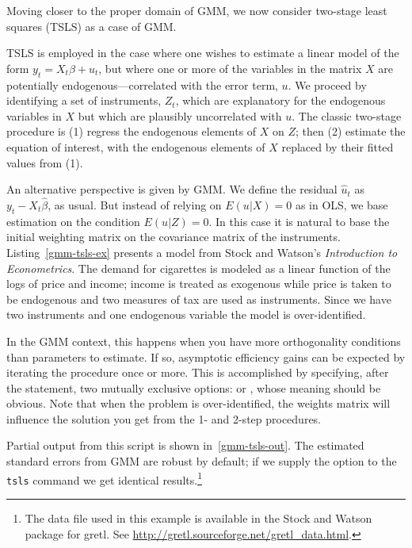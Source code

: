 Moving closer to the proper domain of GMM, we now consider two-stage
least squares (TSLS) as a case of GMM.  

TSLS is employed in the case where one wishes to estimate a linear
model of the form $y_t = X_t \beta + u_t$, but where one or more of
the variables in the matrix $X$ are potentially
endogenous---correlated with the error term, $u$.  We proceed by
identifying a set of instruments, $Z_t$, which are explanatory for the
endogenous variables in $X$ but which are plausibly uncorrelated with
$u$.  The classic two-stage procedure is (1) regress the endogenous
elements of $X$ on $Z$; then (2) estimate the equation of interest,
with the endogenous elements of $X$ replaced by their fitted values
from (1).

An alternative perspective is given by GMM.  We define the residual
$\hat{u}_t$ as $y_t - X_t \hat{\beta}$, as usual.  But instead of
relying on $E(u|X) = 0$ as in OLS, we base estimation on the condition
$E(u|Z) = 0$.  In this case it is natural to base the initial
weighting matrix on the covariance matrix of the instruments.
Listing~\ref{gmm-tsls-ex} presents a model from Stock and Watson's
\textit{Introduction to Econometrics}.  The demand for cigarettes is
modeled as a linear function of the logs of price and income; income
is treated as exogenous while price is taken to be endogenous and two
measures of tax are used as instruments.  Since we have two
instruments and one endogenous variable the model is over-identified.

In the GMM context, this happens when you have more orthogonality
conditions than parameters to estimate. If so, asymptotic efficiency
gains can be expected by iterating the procedure once or more. This is
accomplished by specifying, after the  statement, two
mutually exclusive options:  or ,
whose meaning should be obvious.  Note that when the problem is
over-identified, the weights matrix will influence the solution you
get from the 1- and 2-step procedures.



Partial output from this script is shown in~\ref{gmm-tsls-out}.  The
estimated standard errors from GMM are robust by default; if we supply
the  option to the \texttt{tsls} command we get
identical results.\footnote{The data file used in this example is
  available in the Stock and Watson package for gretl.  See
  \url{http://gretl.sourceforge.net/gretl_data.html}.}

